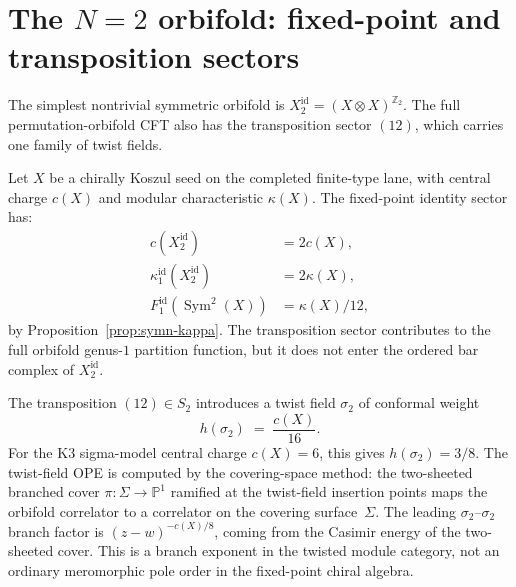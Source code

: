 
\section{The \texorpdfstring{$N = 2$}{N = 2} orbifold:
fixed-point and transposition sectors}\label{sec:symn-n2-explicit}

The simplest nontrivial symmetric orbifold is
$X_2^{\mathrm{id}}=(X\otimes X)^{\mathbb Z_2}$. The full
permutation-orbifold CFT also has the transposition sector $(12)$,
which carries one family of twist fields.

\begin{computation}
\label{comp:sym2-explicit}
Let $X$ be a chirally Koszul seed on the completed finite-type lane,
with central charge $c(X)$ and modular characteristic $\kappa(X)$.
The fixed-point identity sector has:
\begin{align}
 c(X_2^{\mathrm{id}})
 &= 2c(X), \label{eq:sym2-c} \\
 \kappa^{\mathrm{id}}_1(X_2^{\mathrm{id}})
 &= 2 \kappa(X), \label{eq:sym2-kappa} \\
 F^{\mathrm{id}}_1(\operatorname{Sym}^2(X))
 &= \kappa(X) / 12, \label{eq:sym2-f1}
\end{align}
by Proposition~\ref{prop:symn-kappa}. The transposition sector
contributes to the full orbifold genus-$1$ partition function, but
it does not enter the ordered bar complex of $X_2^{\mathrm{id}}$.
\end{computation}

\begin{remark}[The twist field at $N = 2$]
\label{rem:sym2-twist-field}
The transposition $(12) \in S_2$ introduces a twist field
$\sigma_2$ of conformal weight
\begin{equation}\label{eq:sym2-twist-weight}
 h(\sigma_2) \;=\; \frac{c(X)}{16}.
\end{equation}
For the K3 sigma-model central charge $c(X)=6$, this gives
$h(\sigma_2)=3/8$.
The twist-field OPE is computed by the covering-space method:
the two-sheeted branched cover $\pi \colon \Sigma \to
\mathbb{P}^1$ ramified at the twist-field insertion points
maps the orbifold correlator to a correlator on the
covering surface~$\Sigma$. The leading
$\sigma_2$--$\sigma_2$ branch factor is
$(z-w)^{-c(X)/8}$, coming from the Casimir energy of the
two-sheeted cover. This is a branch exponent in the twisted module
category, not an ordinary meromorphic pole order in the fixed-point
chiral algebra.
\end{remark}

